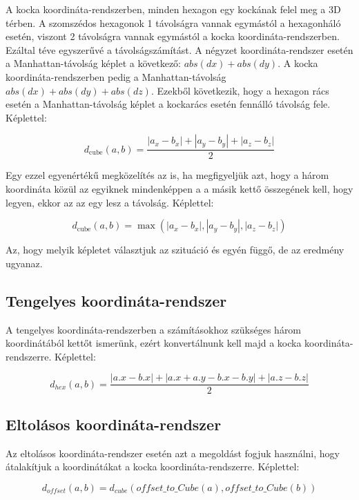A kocka koordináta-rendszerben, minden hexagon egy kockának felel meg a 3D térben. A szomszédos hexagonok 1 távolságra vannak egymástól a hexagonháló esetén, viszont 2 távolságra vannak egymástól a kocka koordináta-rendszerben. Ezáltal téve egyszerűvé a távolságszámítást. A négyzet koordináta-rendszer esetén a Manhattan-távolság képlet a következő: $abs(dx) + abs(dy)$. A kocka koordináta-rendszerben pedig a Manhattan-távolság $abs(dx) + abs(dy) + abs(dz)$. Ezekből következik, hogy a hexagon rács esetén a Manhattan-távolság képlet a kockarács esetén fennálló távolság fele.
\newline
\newline Képlettel:

$$
d_{\text{cube}}(a, b) =
\dfrac{|a_x - b_x| + |a_y - b_y| + |a_z - b_z|}{2}
$$

\noindent Egy ezzel egyenértékű megközelítés az is, ha megfigyeljük azt, hogy a három koordináta közül az egyiknek mindenképpen a a másik kettő összegének kell, hogy legyen, ekkor az az egy lesz a távolság. 
\newline
\newline Képlettel:

$$
d_{\text{cube}}(a, b) =
\max(
|a_x - b_x|, |a_y - b_y|, |a_z - b_z|
)
$$

\noindent Az, hogy melyik képletet választjuk az szituáció és egyén függő, de az eredmény ugyanaz.

\subsection{Tengelyes koordináta-rendszer}

A tengelyes koordináta-rendszerben a számításokhoz szükséges három koordinátából kettőt ismerünk, ezért konvertálnunk kell majd a kocka koordináta-rendszerre.
\newline
\newline Képlettel:

$$
d_{hex}(a, b) = \frac{|a.x - b.x| + |a.x + a.y - b.x - b.y| + |a.z - b.z|}{2}
$$

\subsection{Eltolásos koordináta-rendszer}

Az eltolásos koordináta-rendszer esetén azt a megoldást fogjuk használni, hogy átalakítjuk a koordinátákat a kocka koordináta-rendszerre.
\newline
\newline Képlettel:

$$
d_{offset} (a, b) = d_{cube}(offset\_to\_Cube(a), offset\_to\_Cube(b)) 
$$

